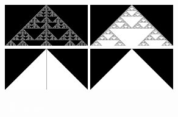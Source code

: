 \documentclass{article}
\newcommand{\todo}[1]{\colorbox{WildStrawberry}{\textcolor{white}{#1}}}
\begin{document}
\begin{figure}[h]
    \includegraphics[width=0.32\textwidth]{ca-rules/double1-close/rule-150.png}%
    \hspace{0.01\textwidth}%
    \includegraphics[width=0.32\textwidth]{ca-rules/double1-close/rule-182.png}\\%
    \vspace{0.01\textwidth}%
    \includegraphics[width=0.32\textwidth]{ca-rules/double1-close/rule-222.png}%
    \hspace{0.01\textwidth}%
    \includegraphics[width=0.32\textwidth]{ca-rules/double1-close/rule-254.png}%
    \hspace{0.01\textwidth}%
    \caption{\todo{fill caption}}
    \label{fig:supplement:ca-rules-double-close}
\end{figure}
\end{document}
